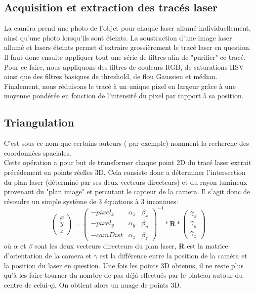 \documentclass[a4paper,10pt]{report}
\begin{document}
\subsection{Acquisition et extraction des tracés laser}
La caméra prend une photo de l’objet pour chaque laser allumé individuellement, ainsi qu'une photo lorsqu’ils sont éteints. La soustraction d'une image laser allumé et lasers éteints permet d'extraire grossièrement le tracé laser en question. Il faut donc ensuite appliquer tout une série de filtres afin de "purifier" ce tracé. Pour ce faire, nous appliquons des filtres de couleurs RGB, de saturations HSV ainsi que des filtres basiques de threshold, de flou Gaussien et médian. Finalement, nous réduisons le tracé à un unique pixel en largeur grâce à une moyenne pondérée en fonction de l'intensité du pixel par rapport à sa position.

\subsection{Triangulation}
C'est sous ce nom que certains auteurs (\cite{Forsyth} par exemple) nomment la recherche des coordonnées spaciales.\\
Cette opération a pour but de transformer chaque point 2D du tracé laser extrait précédement en points réelles 3D. Cela consiste donc a déterminer l'intersection du plan laser (déterminé par ses deux vecteurs directeurs) et du rayon lumineux provenant du "plan image" et percutant le capteur de la camera. Il s'agit donc de résoudre un simple système de 3 équations à 3 inconnues:\\

\begin{equation}
\begin{pmatrix}
x\\ y\\ z
\end{pmatrix}
=
\begin{pmatrix}
-pixel_x & \alpha_x & \beta_x \\
-pixel_y & \alpha_y & \beta_y \\
-camDist & \alpha_z & \beta_z
\end{pmatrix}^{-1}
*\textbf{R}*
\begin{pmatrix}
\gamma_x \\
\gamma_y \\
\gamma_z
\end{pmatrix}
\end{equation}
où $\alpha$ et $\beta$ sont les deux vecteurs directeurs du plan laser, \textbf{R} est la matrice d'orientation de la camera et $\gamma$ est la différence entre la position de la caméra et la position du laser en question.
Une fois les points 3D obtenus, il ne reste plus qu'à les faire tourner du nombre de pas déjà effectués par le plateau autour du centre de celui-çi.
On obtient alors un nuage de points 3D.
\end{document}
